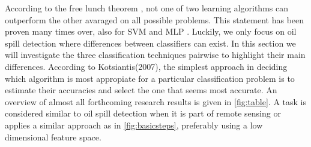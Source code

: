  
According to the free lunch theorem \cite{wolpert1995no}, not one of two learning algorithms can outperform the other avaraged on all possible problems. This statement has been proven many times over, also for SVM and MLP \cite{Moavenian20103088,Zanaty2012177,jin2005neural}. Luckily, we only focus on oil spill detection where differences between classifiers can exist. In this section we will investigate the three classification techniques pairwise to highlight their main differences. According to Kotsiantis(2007), the simplest approach in deciding which algorithm is most appropiate for a particular classification problem is to estimate their accuracies and select the one that seems most accurate\cite{kotsiantis2007supervised}. An overview of almost all forthcoming research results is given in \ref{fig:table}. A task is considered similar to oil spill detection when it is part of remote sensing or applies a similar approach as in \ref{fig:basicsteps}, preferably using a low dimensional feature space.